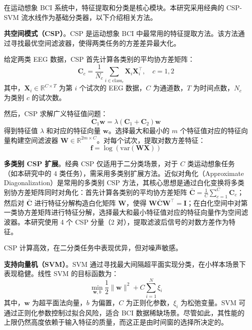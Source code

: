 \label{sec:feature_classification}

在运动想象 BCI 系统中，特征提取和分类是核心模块\cite{lotte2007review}。本研究采用经典的 CSP-SVM 流水线作为基础分类器，以下介绍相关方法。

\textbf{共空间模式（CSP）}。CSP 是运动想象 BCI 中最常用的特征提取方法\cite{blankertz2008optimizing}。该方法通过寻找最优空间滤波器，使得两类任务的方差差异最大化。

给定两类 EEG 数据，CSP 首先计算各类别的平均协方差矩阵：
\begin{equation}
\mathbf{C}_c = \frac{1}{N_c} \sum_{i \in \text{class}_c} \mathbf{X}_i \mathbf{X}_i^\top, \quad c = 1, 2
\end{equation}
其中，$\mathbf{X}_i \in \mathbb{R}^{C \times T}$ 为第 $i$ 个试次的 EEG 数据，$C$ 为通道数，$T$ 为时间点数，$N_c$ 为类别 $c$ 的试次数\cite{blankertz2008optimizing}。

然后，CSP 求解广义特征值问题：
\begin{equation}
\mathbf{C}_1 \mathbf{w} = \lambda (\mathbf{C}_1 + \mathbf{C}_2) \mathbf{w}
\end{equation}
得到特征值 $\lambda$ 和对应的特征向量 $\mathbf{w}$\cite{blankertz2008optimizing}。选择最大和最小的 $m$ 个特征值对应的特征向量构建空间滤波器 $\mathbf{W} \in \mathbb{R}^{2m \times C}$。对每个试次，提取对数方差特征：
\begin{equation}
\mathbf{f} = \log \left( \text{var}(\mathbf{W} \mathbf{X}) \right)
\end{equation}

\textbf{多类别 CSP 扩展}。经典 CSP 仅适用于二分类场景，对于 $C$ 类运动想象任务（如本研究中的 4 类任务），需采用多类别扩展方法\cite{blankertz2008optimizing}。近似对角化（Approximate Diagonalization）是常用的多类别 CSP 方法，其核心思想是通过白化变换将多类别协方差矩阵同时对角化：首先计算各类别的平均协方差矩阵 $\bar{\mathbf{C}} = \frac{1}{C}\sum_{c=1}^{C} \mathbf{C}_c$；然后对 $\bar{\mathbf{C}}$ 进行特征分解构造白化矩阵 $\mathbf{W}$，使得 $\mathbf{W} \bar{\mathbf{C}} \mathbf{W}^{\top} = \mathbf{I}$；在白化空间中对第一类协方差矩阵进行特征分解，选择最大和最小特征值对应的特征向量作为空间滤波器。本研究使用 4 个 CSP 分量（2 对），提取滤波后信号的对数方差作为特征。

CSP 计算高效，在二分类任务中表现优异，但对噪声敏感\cite{lotte2011regularizing}。

\textbf{支持向量机（SVM）}。SVM 通过寻找最大间隔超平面实现分类，在小样本场景下表现稳健\cite{lotte2007review}。线性 SVM 的目标函数为：
\begin{equation}
\min_{\mathbf{w}, b} \frac{1}{2} \|\mathbf{w}\|^2 + C \sum_{i=1}^N \xi_i
\end{equation}
其中，$\mathbf{w}$ 为超平面法向量，$b$ 为偏置，$C$ 为正则化参数，$\xi_i$ 为松弛变量。SVM 可通过正则化参数控制过拟合风险，适合 BCI 数据稀缺场景。尽管如此，其性能的上限仍然高度依赖于输入特征的质量，而这正是由时间窗的选择所决定的。

